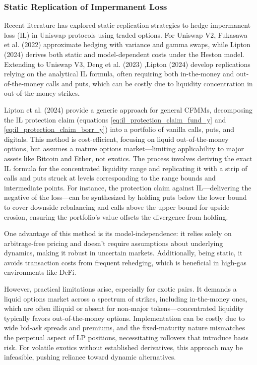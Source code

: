 \documentclass{article}
\begin{document}
\subsubsection{Static Replication of Impermanent Loss}

Recent literature has explored static replication strategies to hedge impermanent loss (IL) in Uniswap protocols using traded options. For Uniswap V2, Fukasawa et al. (2022) \cite{Fukasawa2022} approximate hedging with variance and gamma swaps, while Lipton (2024) \cite{lipton2024} derives both static and model-dependent costs under the Heston model. Extending to Uniswap V3, Deng et al. (2023) ,Lipton (2024) \cite{lipton2024} develop replications relying on the analytical IL formula, often requiring both in-the-money and out-of-the-money calls and puts, which can be costly due to liquidity concentration in out-of-the-money strikes.

Lipton et al. (2024) provide a generic approach for general CFMMs, decomposing the IL protection claim (equations \eqref{eq:il_protection_claim_fund_y} and \eqref{eq:il_protection_claim_borr_y}) into a portfolio of vanilla calls, puts, and digitals. This method is cost-efficient, focusing on liquid out-of-the-money options, but assumes a mature options market—limiting applicability to major assets like Bitcoin and Ether, not exotics. 
The process involves deriving the exact IL formula for the concentrated liquidity range and replicating it with a strip of calls and puts struck at levels corresponding to the range bounds and intermediate points. For instance, the protection claim against IL—delivering the negative of the loss—can be synthesized by holding puts below the lower bound to cover downside rebalancing and calls above the upper bound for upside erosion, ensuring the portfolio's value offsets the divergence from holding.

One advantage of this method is its model-independence: it relies solely on arbitrage-free pricing and doesn't require assumptions about underlying dynamics, making it robust in uncertain markets. Additionally, being static, it avoids transaction costs from frequent rehedging, which is beneficial in high-gas environments like DeFi.

However, practical limitations arise, especially for exotic pairs. It demands a liquid options market across a spectrum of strikes, including in-the-money ones, which are often illiquid or absent for non-major tokens—concentrated liquidity typically favors out-of-the-money options. Implementation can be costly due to wide bid-ask spreads and premiums, and the fixed-maturity nature mismatches the perpetual aspect of LP positions, necessitating rollovers that introduce basis risk. For volatile exotics without established derivatives, this approach may be infeasible, pushing reliance toward dynamic alternatives.
\end{document}
